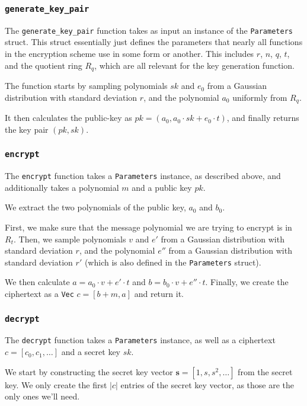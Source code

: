 \documentclass[../main.tex]{subfiles}
\begin{document}
\subsubsection{\lstinline{generate_key_pair}}

The \lstinline{generate_key_pair} function takes as input an instance of the \lstinline{Parameters} struct.
This struct essentially just defines the parameters that nearly all functions in the encryption scheme use in some form or another.
This includes $r$, $n$, $q$, $t$, and the quotient ring $R_q$, which are all relevant for the key generation function.

The function starts by sampling polynomials $sk$ and $e_0$ from a Gaussian distribution with standard deviation $r$, and the polynomial $a_0$ uniformly from $R_q$.

It then calculates the public-key as $pk = (a_0, a_0 \cdot sk + e_0 \cdot t)$, and finally returns the key pair $(pk, sk)$.

\subsubsection{\lstinline{encrypt}}

The \lstinline{encrypt} function takes a \lstinline{Parameters} instance, as described above, and additionally takes a polynomial $m$ and a public key $pk$.

We extract the two polynomials of the public key, $a_0$ and $b_0$.

First, we make sure that the message polynomial we are trying to encrypt is in $R_t$.
Then, we sample polynomials $v$ and $e'$ from a Gaussian distribution with standard deviation $r$, and the polynomial $e''$ from a Gaussian distribution with standard deviation $r'$ (which is also defined in the \lstinline{Parameters} struct).

We then calculate $a = a_0 \cdot v + e' \cdot t$ and $b = b_0 \cdot v + e'' \cdot t$.
Finally, we create the ciphertext as a \lstinline{Vec} $c = [b + m, a]$ and return it.

\subsubsection{\lstinline{decrypt}}

The \lstinline{decrypt} function takes a \lstinline{Parameters} instance, as well as a ciphertext $c = [c_0, c_1, \dots]$ and a secret key $sk$.

We start by constructing the secret key vector $\mathbf{s} = [1, s, s^2, \dots]$ from the secret key.
We only create the first $|c|$ entries of the secret key vector, as those are the only ones we'll need.
\end{document}
